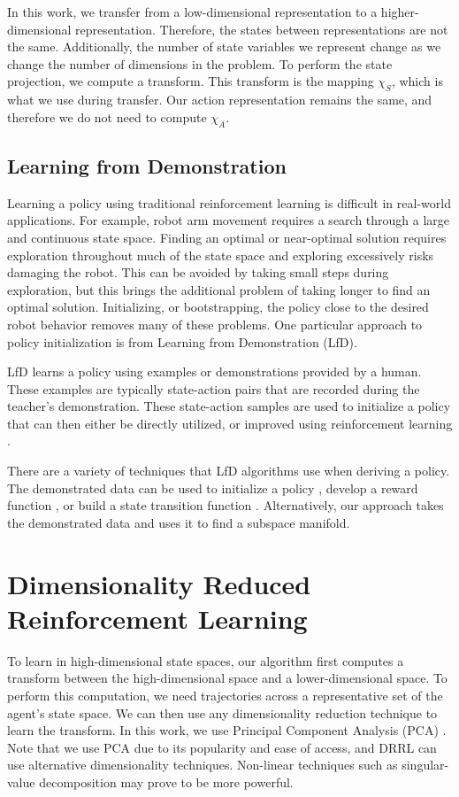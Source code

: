 \documentclass[10pt,a4paper]{article}
\begin{document}
In this work, we transfer from a low-dimensional representation to a higher-dimensional representation. Therefore, the states between representations are not the same. Additionally, the number of state variables we represent change as we change the number of dimensions in the problem. To perform the state projection, we compute a transform. This transform is the mapping $\chi_S$, which is what we use during transfer. Our action representation remains the same, and therefore we do not need to compute $\chi_A$. 


\subsection{Learning from Demonstration}
Learning a policy using traditional reinforcement learning is difficult in real-world applications. For example, robot arm movement requires a search through a large and continuous state space. Finding an optimal or near-optimal solution requires exploration throughout much of the state space and exploring excessively risks damaging the robot. This can be avoided by taking small steps during exploration, but this brings the additional problem of taking longer to find an optimal solution. Initializing, or bootstrapping, the policy close to the desired robot behavior removes many of these problems. One particular approach to policy initialization is from Learning from Demonstration (LfD). 

LfD learns a policy using examples or demonstrations provided by a human. These examples are typically state-action pairs that are recorded during the teacher’s demonstration. These state-action samples are used to initialize a policy that can then either be directly utilized, or improved using reinforcement learning \cite{Argall:2009:SRL:1523530.1524008}.

There are a variety of techniques that LfD algorithms use when deriving
a policy. The demonstrated data can be used to initialize a policy \cite{4058714}, develop a reward function \cite{Thomaz:2006:RLH:1597538.1597696}, or build a state transition function \cite{Argall:2009:SRL:1523530.1524008}. Alternatively, our approach takes the demonstrated data and uses it to find a subspace manifold. 

\section{Dimensionality Reduced Reinforcement Learning}
\label{High-Dimensional}
To learn in high-dimensional state spaces, our algorithm first computes a transform between the high-dimensional space and a lower-dimensional space. To perform this computation, we need trajectories across a representative set of the agent's state space. We can then use any dimensionality reduction technique to learn the transform. In this work, we use Principal Component Analysis (PCA) \cite{PCA}. Note that we use PCA due to its popularity and ease of access, and DRRL can use alternative dimensionality techniques. Non-linear techniques such as singular-value decomposition \cite{Lathauwer:2000:MSV:354353.354398} may prove to be more powerful. 
\end{document}
